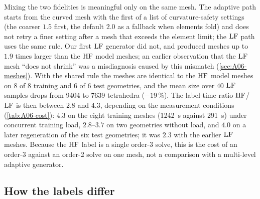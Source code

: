 Mixing the two fidelities is meaningful only on the same mesh. The adaptive path starts from the curved
mesh with the first of a list of curvature-safety settings (the coarser $1.5$ first, the default $2.0$ as a fallback
when elements fold) and does not retry a finer setting after a mesh that exceeds the element limit; the $\mathrm{LF}$ path
uses the same rule.
Our first $\mathrm{LF}$ generator did not, and produced meshes up to $1.9$ times larger than the $\mathrm{HF}$ model meshes; an earlier
observation that the $\mathrm{LF}$ mesh ``does not shrink'' was a misdiagnosis caused by this mismatch (\cref{sec:A06-meshes}).
With the shared rule the meshes are identical to the $\mathrm{HF}$ model meshes on 8 of 8 training and 6 of 6 test geometries,
and the mean size over 40 $\mathrm{LF}$ samples drops from 9404 to 7639 tetrahedra ($-19\,\%$).
The label-time ratio $\mathrm{HF}$/$\mathrm{LF}$ is then between $2.8$ and $4.3$, depending on the measurement conditions
(\cref{tab:A06-cost}): $4.3$ on the eight training meshes (\SI{1242}{s} against \SI{291}{s}) under concurrent training
load, $2.8$--$3.7$ on two geometries without load, and $4.0$ on a later regeneration of the six test geometries; it
was $2.3$ with the earlier $\mathrm{LF}$ meshes. Because the $\mathrm{HF}$
label is a single order-3 solve, this is the cost of an order-3 against an order-2 solve on one mesh, not a comparison
with a multi-level adaptive generator.

\subsection{How the labels differ}\label{sec:06-diff}

